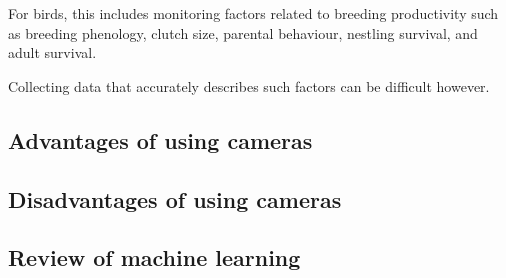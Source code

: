 \documentclass[]{scrartcl}
\begin{document}
For birds, this includes monitoring factors related to breeding productivity such as breeding phenology, clutch size, parental behaviour, nestling survival, and adult survival.

Collecting data that accurately describes such factors can be difficult however.


\begin{env}
	
\end{env}

\newpage

\subsection*{Advantages of using cameras}


\newpage

\subsection*{Disadvantages of using cameras}
\newpage

\subsection*{Review of machine learning}
\end{document}
